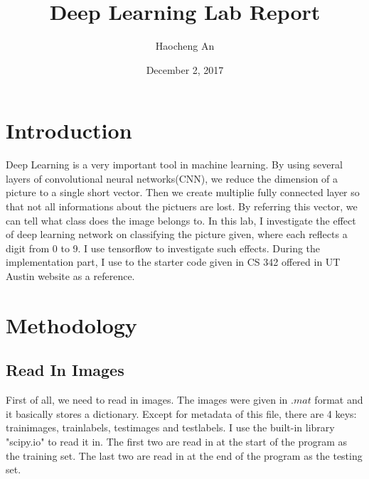 \documentclass[a4paper,10pt]{article}
\title{Deep Learning Lab Report}
\author{Haocheng An}
\date{December 2, 2017}
\begin{document}
	
\maketitle
\section{Introduction}

\par Deep Learning is a very important tool in machine learning. By using several layers of convolutional neural networks(CNN), we reduce the dimension of a picture to a single short vector. Then we create multiplie fully connected layer so that not all informations about the pictuers are lost. By referring this vector, we can tell what class does the image belongs to. In this lab, I investigate the effect of deep learning network on classifying the picture given, where each reflects a digit from 0 to 9. I use tensorflow to investigate such effects. During the implementation part, I use to the starter code given in CS 342 offered in UT Austin website as a reference.\cite{code} 
\section{Methodology}
\subsection{Read In Images}
First of all, we need to read in images. The images were given in $.mat$ format and it basically stores a dictionary. Except for metadata of this file, there are 4 keys: trainimages, trainlabels, testimages and testlabels. I use the built-in library "scipy.io" to read it in. The first two are read in at the start of the program as the training set. The last two are read in at the end of the program as the testing set.
\end{document}
